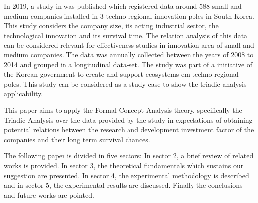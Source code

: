 \documentclass[a4paper,twoside]{article}
\begin{document}
In 2019, a study in \cite{KIM2019103967} was published which registered data around 588 small and medium companies installed in 3 techno-regional innovation poles in South Korea. This study considers the company size, its acting industrial sector, the technological innovation and its survival time. The relation analysis of this data can be considered relevant for effectiveness studies in innovation area of small and medium companies. The data was annually collected between the years of 2008 to 2014 and grouped in a longitudinal data-set. The study was part of a initiative of the Korean government to create and support ecosystems em techno-regional poles. This study can be considered as a study case to show the triadic analysis applicability.

This paper aims to apply the Formal Concept Analysis theory, specifically the Triadic Analysis over the data provided by the study \cite{KIM2019103967} in expectations of obtaining potential relations between the research and development investment factor of the companies and their long term survival chances.

The following paper is divided in five sectors: In sector 2, a brief review of related works is provided. In sector 3, the theoretical fundamentals which sustains our suggestion are presented. In sector 4, the experimental methodology is described and in sector 5, the experimental results are discussed. Finally the conclusions and future works are pointed.
\end{document}

